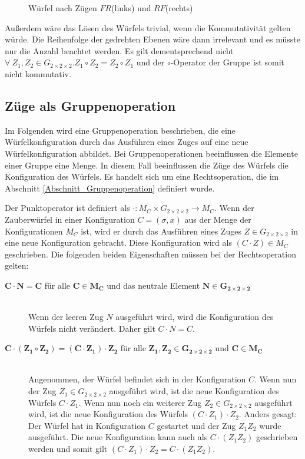 \documentclass[12pt,a4paper, usenames, dvipsnames]{article}
\theoremstyle{mystyle}
\theoremstyle{definition}
\newcommand{\Gtwo}{\ensuremath{G_{2\times 2\times 2}}}
\begin{document}
\begin{figure}[H]
\caption[Würfel nach Zügen $FR$ (links) und $RF$ (rechts)]{Würfel nach Zügen $FR$(links) und $RF$(rechts)}
\label{Abbildung_WürfelNachFRundRF}
\end{figure}
Außerdem wäre das Lösen des Würfels trivial, wenn die Kommutativität gelten würde. \cite{TD} Die Reihenfolge der gedrehten Ebenen wäre dann irrelevant und es müsste nur die Anzahl beachtet werden. 
Es gilt dementsprechend nicht $\forall \  Z_1, Z_2 \in \Gtwo. Z_1 \circ Z_2 = Z_2 \circ Z_1$ und der $\circ$-Operator der Gruppe ist somit nicht kommutativ. 

%
%
%
%
%
%
%
%
%
%
%
%
%
%
%
%
%
%
%
%
\subsection{Züge als Gruppenoperation}

Im Folgenden wird eine Gruppenoperation beschrieben, die eine Würfelkonfiguration durch das Ausführen eines Zuges auf eine neue Würfelkonfiguration abbildet. Bei Gruppenoperationen beeinflussen die Elemente einer Gruppe eine Menge. In diesem Fall beeinflussen die Züge des Würfels die Konfiguration des Würfels. Es handelt sich um eine Rechtsoperation, die im Abschnitt \ref{Abschnitt_Gruppenoperation} definiert wurde.

Der Punktoperator ist definiert als $\cdot: M_C \times \Gtwo \rightarrow M_C$. Wenn der Zauberwürfel in einer Konfiguration $C=(\sigma, x)$ aus der Menge der Konfigurationen $M_C$ ist, wird er durch das Ausführen eines Zuges $Z \in \Gtwo$ in eine neue Konfiguration gebracht. Diese Konfiguration wird als $(C \cdot Z) \in M_C$ geschrieben.
Die folgenden beiden Eigenschaften müssen bei der Rechtsoperation gelten:

\begin{description}
\item [$\boldsymbol{C \cdot N = C}$ für alle $\boldsymbol{C \in M_C}$ und das neutrale Element $\boldsymbol{N \in \Gtwo}$] 
\ \\
Wenn der leeren Zug $N$ ausgeführt wird, wird die Konfiguration des Würfels nicht verändert. Daher gilt $C \cdot N = C$. 

\item [$\boldsymbol{C \cdot (Z_1 \circ Z_2) = (C \cdot Z_1) \cdot Z_2}$ für alle $\boldsymbol{Z_1, Z_2 \in \Gtwo}$ und $\boldsymbol{C \in M_C}$]
\ \\
Angenommen, der Würfel befindet sich in der Konfiguration $C$. Wenn nun der Zug $Z_1 \in \Gtwo$ ausgeführt wird, ist die neue Konfiguration des Würfels $C \cdot Z_1$. Wenn nun noch ein weiterer Zug $Z_2 \in \Gtwo$ ausgeführt wird, ist die neue Konfiguration des Würfels $(C \cdot Z_1) \cdot Z_2$. 
Anders gesagt: Der Würfel hat in Konfiguration $C$ gestartet und der Zug $Z_1 Z_2$ wurde ausgeführt. Die neue Konfiguration kann auch als $C \cdot (Z_1 Z_2)$ geschrieben werden und somit gilt $(C \cdot Z_1) \cdot Z_2 = C \cdot (Z_1 Z_2)$. 
\end{description}
\end{document}
